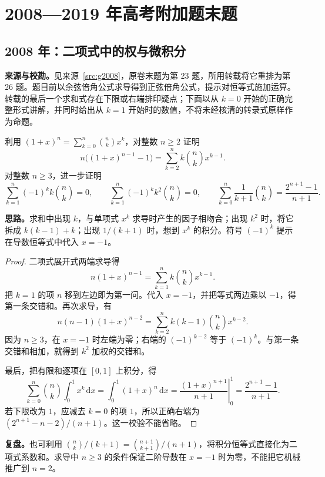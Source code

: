 \documentclass[UTF8]{ctexart}
\begin{document}
\section{2008—2019 年高考附加题末题}\label{sec:gaokao}
\subsection{2008 年：二项式中的权与微积分}\label{sec:g2008}
\textbf{来源与校勘。}见来源~\ref{src:g2008}，原卷末题为第 23 题，所用转载将它重排为第 26 题。题目前以余弦倍角公式求导得到正弦倍角公式，提示对恒等式施加运算。转载的最后一个求和式存在下限或右端排印疑点；下面以从 $k=0$ 开始的正确完整形式讲解，并同时给出从 $k=1$ 开始时的数值，不将未经核清的转录式原样作为命题。

\begin{example}[题意与经校验的恒等式]
利用 $(1+x)^n=\sum_{k=0}^{n}\binom nkx^k$，对整数 $n\geq2$ 证明
\[
n\bigl((1+x)^{n-1}-1\bigr)=\sum_{k=2}^{n}k\binom nkx^{k-1}.
\]
对整数 $n\geq3$，进一步证明
\[
\sum_{k=1}^{n}(-1)^kk\binom nk=0,\qquad
\sum_{k=1}^{n}(-1)^kk^2\binom nk=0,
\qquad
\sum_{k=0}^{n}\frac{1}{k+1}\binom nk=\frac{2^{n+1}-1}{n+1}.
\]
\end{example}
\textbf{思路。}求和中出现 $k$，与单项式 $x^k$ 求导时产生的因子相吻合；出现 $k^2$ 时，将它拆成 $k(k-1)+k$；出现 $1/(k+1)$ 时，想到 $x^k$ 的积分。符号 $(-1)^k$ 提示在导数恒等式中代入 $x=-1$。
\begin{proof}
二项式展开式两端求导得
\[
n(1+x)^{n-1}=\sum_{k=1}^{n}k\binom nkx^{k-1}.
\]
把 $k=1$ 的项 $n$ 移到左边即为第一问。代入 $x=-1$，并把等式两边乘以 $-1$，得第一条交错和。再次求导，有
\[
n(n-1)(1+x)^{n-2}=\sum_{k=2}^{n}k(k-1)\binom nkx^{k-2}.
\]
因为 $n\geq3$，在 $x=-1$ 时左端为零；右端的 $(-1)^{k-2}$ 等于 $(-1)^k$。与第一条交错和相加，就得到 $k^2$ 加权的交错和。

最后，把有限和逐项在 $[0,1]$ 上积分，得
\[
\sum_{k=0}^{n}\binom nk\int_0^1x^k\,\mathrm dx
=\int_0^1(1+x)^n\,\mathrm dx
=\left.\frac{(1+x)^{n+1}}{n+1}\right|_0^1
=\frac{2^{n+1}-1}{n+1}.
\]
若下限改为 $1$，应减去 $k=0$ 的项 $1$，所以正确右端为 $(2^{n+1}-n-2)/(n+1)$。这一校验不能省略。
\end{proof}
\textbf{复盘。}也可利用 $\binom nk/(k+1)=\binom{n+1}{k+1}/(n+1)$，将积分恒等式直接化为二项式系数和。求导中 $n\geq3$ 的条件保证二阶导数在 $x=-1$ 时为零，不能把它机械推广到 $n=2$。
\end{document}
